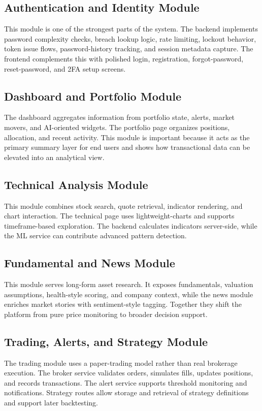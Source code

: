 \documentclass[12pt,a4paper]{report}
\begin{document}
\subsection{Authentication and Identity Module}
This module is one of the strongest parts of the system. The backend implements password complexity checks, breach lookup logic, rate limiting, lockout behavior, token issue flows, password-history tracking, and session metadata capture. The frontend complements this with polished login, registration, forgot-password, reset-password, and 2FA setup screens.

\subsection{Dashboard and Portfolio Module}
The dashboard aggregates information from portfolio state, alerts, market movers, and AI-oriented widgets. The portfolio page organizes positions, allocation, and recent activity. This module is important because it acts as the primary summary layer for end users and shows how transactional data can be elevated into an analytical view.

\subsection{Technical Analysis Module}
This module combines stock search, quote retrieval, indicator rendering, and chart interaction. The technical page uses lightweight-charts and supports timeframe-based exploration. The backend calculates indicators server-side, while the ML service can contribute advanced pattern detection.

\subsection{Fundamental and News Module}
This module serves long-form asset research. It exposes fundamentals, valuation assumptions, health-style scoring, and company context, while the news module enriches market stories with sentiment-style tagging. Together they shift the platform from pure price monitoring to broader decision support.

\subsection{Trading, Alerts, and Strategy Module}
The trading module uses a paper-trading model rather than real brokerage execution. The broker service validates orders, simulates fills, updates positions, and records transactions. The alert service supports threshold monitoring and notifications. Strategy routes allow storage and retrieval of strategy definitions and support later backtesting.
\end{document}
